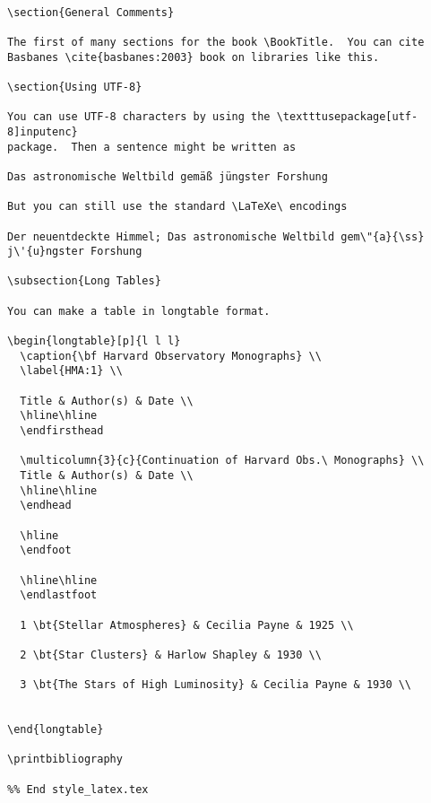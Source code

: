 \begin{verbatim}

\section{General Comments}

The first of many sections for the book \BookTitle.  You can cite 
Basbanes \cite{basbanes:2003} book on libraries like this.

\section{Using UTF-8}

You can use UTF-8 characters by using the \textttusepackage[utf-8]inputenc}
package.  Then a sentence might be written as

Das astronomische Weltbild gemäß jüngster Forshung

But you can still use the standard \LaTeXe\ encodings

Der neuentdeckte Himmel; Das astronomische Weltbild gem\"{a}{\ss} j\'{u}ngster Forshung

\subsection{Long Tables}

You can make a table in longtable format.

\begin{longtable}[p]{l l l}
  \caption{\bf Harvard Observatory Monographs} \\
  \label{HMA:1} \\

  Title & Author(s) & Date \\
  \hline\hline
  \endfirsthead

  \multicolumn{3}{c}{Continuation of Harvard Obs.\ Monographs} \\
  Title & Author(s) & Date \\
  \hline\hline
  \endhead

  \hline
  \endfoot
  
  \hline\hline
  \endlastfoot

  1 \bt{Stellar Atmospheres} & Cecilia Payne & 1925 \\

  2 \bt{Star Clusters} & Harlow Shapley & 1930 \\

  3 \bt{The Stars of High Luminosity} & Cecilia Payne & 1930 \\

  
\end{longtable}

\printbibliography

%% End style_latex.tex
\end{verbatim}

